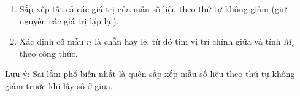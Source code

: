 \begin{enumerate}
\item Sắp xếp tất cả các giá trị của mẫu số liệu theo thứ tự không giảm (giữ nguyên các giá trị lặp lại).
\item Xác định cỡ mẫu $n$ là chẵn hay lẻ, từ đó tìm vị trí chính giữa và tính $M_e$ theo công thức.
\end{enumerate}
Lưu ý: Sai lầm phổ biến nhất là quên sắp xếp mẫu số liệu theo thứ tự không giảm trước khi lấy số ở giữa.

